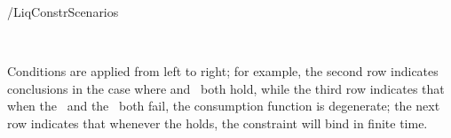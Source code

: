\documentclass[\econtexRoot/BufferStockTheory]{subfiles}
\begin{document}
\begin{verbatimwrite}{\TableDir/LiqConstrScenarios}
\begin{table}[b]
\settowidth\TableWidth{\usebox{\LiqConstrScenarios}}
\usebox{\LiqConstrScenarios}
\\ \medskip 
\parbox{\TableWidth}{\raggedright \footnotesize Conditions are applied from left to right; for example, the second row indicates conclusions in the case where \cncl{\GICRaw} and \RIC~both hold, while the third row indicates that when the \GICRaw~and the \RIC~both fail, the consumption function is degenerate; the next row indicates that whenever the \GICRaw holds, the constraint will bind in finite time.}

\end{table}


\end{verbatimwrite}
\clearpage

\end{document}

